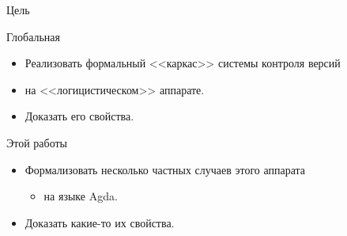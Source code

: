 \begin{frame}{Цель}
  \begin{block}{Глобальная}
  \begin{itemize}
  \item Реализовать формальный <<каркас>> системы контроля версий
  \item на <<логицистическом>> аппарате.
  \item Доказать его свойства.
  \end{itemize}
  \end{block}

  \begin{block}{Этой работы}
  \begin{itemize}
  \item Формализовать несколько частных случаев этого аппарата
    \begin{itemize}
    \item на языке Agda.
    \end{itemize}
  \item Доказать какие-то их свойства.
  \end{itemize}
  \end{block}
\end{frame}
